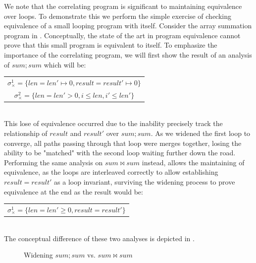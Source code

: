 

We note that the correlating program is significant to maintaining equivalence over loops. To demonstrate this we perform the simple exercise of checking equivalence of a small looping program with itself. Consider the array summation program in . Conceptually, the state of the art in program equivalence cannot prove that this small program is equivalent to itself. To emphasize the importance of the correlating program, we will first show the result of an analysis of $sum;sum$ which will be:
\\
\begin{tabular}{c}
$\sigma_{\times}^1 = \{len = len' \mapsto 0, result = result' \mapsto 0\}$
\\
$\sigma_{\times}^2 = \{len = len' > 0, i \leq len, i' \leq len'\}$
\end{tabular}
\\

This lose of equivalence occurred due to the inability precisely track the relationship of $result$ and $result'$ over $sum;sum$. As we widened the first loop to converge, all paths passing through that loop were merges together, losing the ability to be "matched" with the second loop waiting further down the road. Performing the same analysis on $sum \bowtie sum$ instead, allows the maintaining of equivalence, as the loops are interleaved correctly to allow establishing $result = result'$ as a loop invariant, surviving the widening process to prove equivalence at the end as the result would be:
\\
\begin{tabular}{c}
$\sigma_{\times}^1 = \{len = len' \geq 0, result = result'\}$
\end{tabular}
\\
The conceptual difference of these two analyses is depicted in .
\begin{figure}
\caption{Widening $sum ; sum$ vs. $sum \bowtie sum$}
\end{figure}

